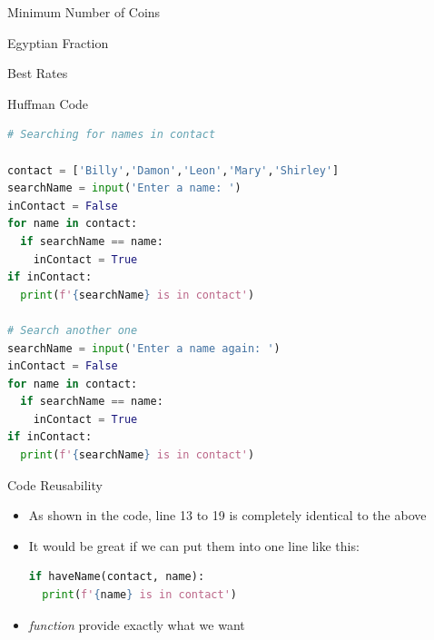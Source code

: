 \documentclass[10pt,xcolor={table,dvipsnames},t]{beamer}
\begin{document}
\begin{frame}{Minimum Number of Coins}
  
\end{frame}

\begin{frame}{Egyptian Fraction}
  
\end{frame}

\begin{frame}{Best Rates}
  
\end{frame}

\begin{frame}{Huffman Code}
  
\end{frame}

\begin{frame}[fragile]
\begin{lstlisting}[language=python]
# Searching for names in contact

contact = ['Billy','Damon','Leon','Mary','Shirley']
searchName = input('Enter a name: ')
inContact = False 
for name in contact:
  if searchName == name:
    inContact = True 
if inContact:
  print(f'{searchName} is in contact')

# Search another one
searchName = input('Enter a name again: ')
inContact = False 
for name in contact:
  if searchName == name:
    inContact = True 
if inContact:
  print(f'{searchName} is in contact')
  \end{lstlisting}
\end{frame}

\begin{frame}[fragile]{Code Reusability}
  \begin{itemize}
    \item As shown in the code, line 13 to 19 is completely identical to the above
    \item It would be great if we can put them into one line like this:
\begin{lstlisting}[language=python]
if haveName(contact, name):
  print(f'{name} is in contact')
\end{lstlisting}
    \item \textit{function} provide exactly what we want
  \end{itemize}
\end{frame}
\end{document}
